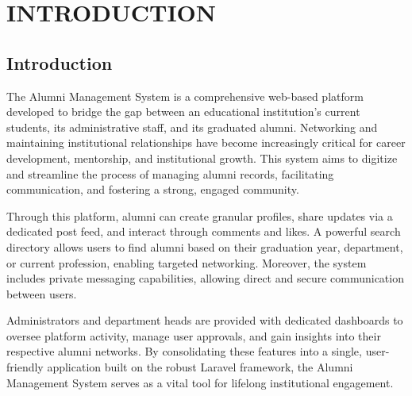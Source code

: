 \chapter{INTRODUCTION}

\section{Introduction}
The Alumni Management System is a comprehensive web-based platform developed to bridge the gap between an educational institution's current students, its administrative staff, and its graduated alumni. Networking and maintaining institutional relationships have become increasingly critical for career development, mentorship, and institutional growth. This system aims to digitize and streamline the process of managing alumni records, facilitating communication, and fostering a strong, engaged community.

Through this platform, alumni can create granular profiles, share updates via a dedicated post feed, and interact through comments and likes. A powerful search directory allows users to find alumni based on their graduation year, department, or current profession, enabling targeted networking. Moreover, the system includes private messaging capabilities, allowing direct and secure communication between users.

Administrators and department heads are provided with dedicated dashboards to oversee platform activity, manage user approvals, and gain insights into their respective alumni networks. By consolidating these features into a single, user-friendly application built on the robust Laravel framework, the Alumni Management System serves as a vital tool for lifelong institutional engagement.
